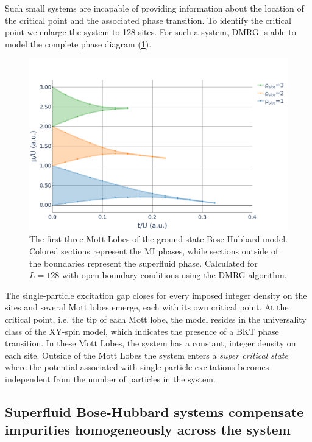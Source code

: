 \documentclass[twoside,twocolumn,9pt]{article}
\begin{document}
Such small systems are incapable of providing information about the location of the critical point and the associated phase transition. To identify the critical point we enlarge the system to 128 sites. For such a system, DMRG is able to model the complete phase diagram (\cref{fig:Mott-Lobes}).
\begin{center}
  \begin{figure}
      \includegraphics[width=\linewidth]{../code/figures/Mott-Lobes.pdf}
      \caption{The first three Mott Lobes of the ground state Bose-Hubbard model. Colored sections represent the MI phases, while sections outside of the boundaries represent the superfluid phase. Calculated for $L=128$ with open boundary conditions using the DMRG algorithm.}
      \label{fig:Mott-Lobes}
  \end{figure}
\end{center}
The single-particle excitation gap closes for every imposed integer density on the sites and several Mott lobes emerge, each with its own critical point. At the critical point, i.e. the tip of each Mott lobe, the model resides in the universality class of the XY-spin model, which indicates the presence of a BKT phase transition. In these Mott Lobes, the system has a constant, integer density on each site. Outside of the Mott Lobes the system enters a \emph{super critical state} where the potential associated with single particle excitations becomes independent from the number of particles in the system.

\subsection{Superfluid Bose-Hubbard systems compensate impurities homogeneously across the system}
\end{document}
